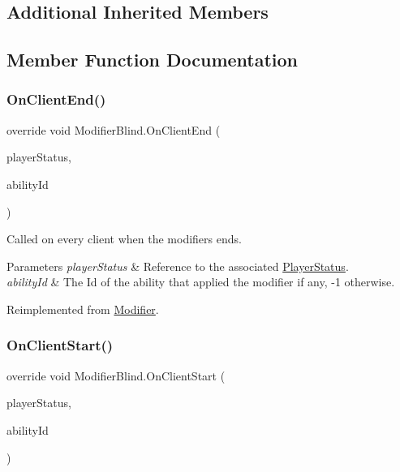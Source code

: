 \subsection*{Additional Inherited Members}


\subsection{Member Function Documentation}
\hypertarget{class_modifier_blind_a4423072654e3eeafc3f12475e3d6c56d}{}\label{class_modifier_blind_a4423072654e3eeafc3f12475e3d6c56d} 
\subsubsection{\texorpdfstring{On\+Client\+End()}{OnClientEnd()}}
{\footnotesize\ttfamily override void Modifier\+Blind.\+On\+Client\+End (\begin{DoxyParamCaption}\item[{\hyperlink{class_player_status}{Player\+Status}}]{player\+Status,  }\item[{int}]{ability\+Id }\end{DoxyParamCaption})\hspace{0.3cm}{\ttfamily [virtual]}}



Called on every client when the modifiers ends. 


\begin{DoxyParams}{Parameters}
{\em player\+Status} & Reference to the associated \hyperlink{class_player_status}{Player\+Status}.\\
\hline
{\em ability\+Id} & The Id of the ability that applied the modifier if any, -\/1 otherwise.\\
\hline
\end{DoxyParams}


Reimplemented from \hyperlink{class_modifier_af9a32f8313b83253dac318eed1ebd7ac}{Modifier}.

\hypertarget{class_modifier_blind_a8cfcbe75907fe9a029b76fedb581ddae}{}\label{class_modifier_blind_a8cfcbe75907fe9a029b76fedb581ddae} 
\subsubsection{\texorpdfstring{On\+Client\+Start()}{OnClientStart()}}
{\footnotesize\ttfamily override void Modifier\+Blind.\+On\+Client\+Start (\begin{DoxyParamCaption}\item[{\hyperlink{class_player_status}{Player\+Status}}]{player\+Status,  }\item[{int}]{ability\+Id }\end{DoxyParamCaption})\hspace{0.3cm}{\ttfamily [virtual]}}



